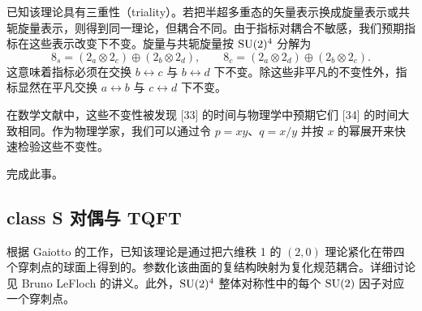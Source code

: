 已知该理论具有三重性（triality）。若把半超多重态的矢量表示换成旋量表示或共轭旋量表示，则得到同一理论，但耦合不同。由于指标对耦合不敏感，我们预期指标在这些表示改变下不变。旋量与共轭旋量按 $\operatorname{SU}(2)^4$ 分解为
\[
8_s=(2_a\otimes2_c)\oplus(2_b\otimes2_d),\qquad
8_c=(2_a\otimes2_d)\oplus(2_b\otimes2_c) .
\tag{3.19}
\]
这意味着指标必须在交换 $b\leftrightarrow c$ 与 $b\leftrightarrow d$ 下不变。除这些非平凡的不变性外，指标显然在平凡交换 $a\leftrightarrow b$ 与 $c\leftrightarrow d$ 下不变。

在数学文献中，这些不变性被发现 [33] 的时间与物理学中预期它们 [34] 的时间大致相同。作为物理学家，我们可以通过令 $p=xy$、$q=x/y$ 并按 $x$ 的幂展开来快速检验这些不变性。
\begin{exercise}[3.2]
完成此事。
\end{exercise}
\subsection{class S 对偶与 TQFT}
根据 Gaiotto 的工作，已知该理论是通过把六维秩 1 的 $(2,0)$ 理论紧化在带四个穿刺点的球面上得到的。参数化该曲面的复结构映射为复化规范耦合。详细讨论见 Bruno LeFloch 的讲义。此外，$\operatorname{SU}(2)^4$ 整体对称性中的每个 $\operatorname{SU}(2)$ 因子对应一个穿刺点。

